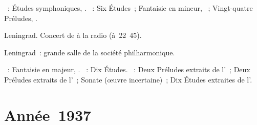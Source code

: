 \begin{description}
 \textsc{\Schumann{}}~: Études symphoniques, .
 \textsc{\Chopin{}}~: Six Études~; Fantaisie en \kF mineur, ~;
 Vingt-quatre Préludes, .
 \item[\DateWithWeekDay{1936-11-20}]
 Leningrad.
 Concert de \VSofronitsky{} à la radio (à~22~45).
 \item[\DateWithWeekDay{1936-11-26}]
 Leningrad~: grande salle de la société philharmonique.

 \textsc{\Schumann{}}~: Fantaisie en \kC majeur, .
 \textsc{\Chopin{}}~: Dix Études.
 \textsc{\Scriabine{}}~: Deux Préludes extraits de l'~; Deux
 Préludes extraits de l'~; Sonate (œuvre incertaine)~; Dix Études
 extraites de l'.
\end{description}

\section{Année~1937}

